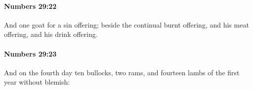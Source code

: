 		\paragraph{Numbers 29:22} %
			\label{NUMBERS-29-22}

			And one goat for a sin offering; beside the continual burnt offering, and his meat offering, and his drink offering.


		\paragraph{Numbers 29:23} %
			\label{NUMBERS-29-23}

			And on the fourth day ten bullocks, two rams, and fourteen lambs of the first year without blemish:


